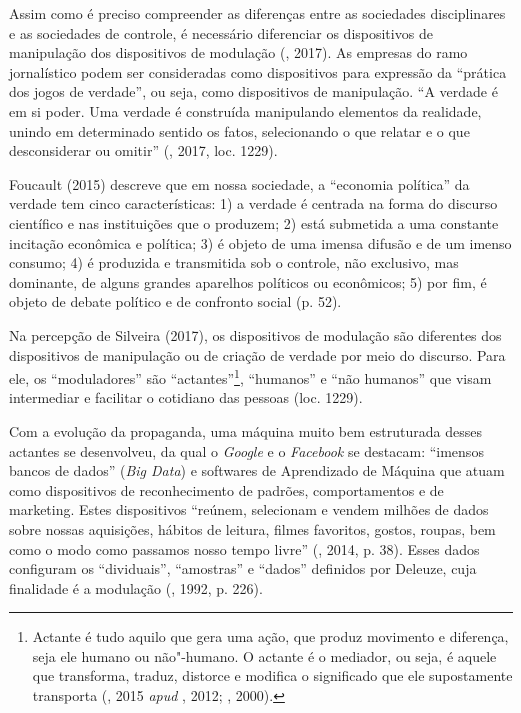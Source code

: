 Assim como é preciso compreender as diferenças entre as sociedades
disciplinares e as sociedades de controle, é necessário diferenciar os
dispositivos de manipulação dos dispositivos de modulação (,
2017). As empresas do ramo jornalístico podem ser consideradas como
dispositivos para expressão da ``prática dos jogos de verdade'', ou
seja, como dispositivos de manipulação. ``A verdade é em si poder. Uma
verdade é construída manipulando elementos da realidade, unindo em
determinado sentido os fatos, selecionando o que relatar e o que
desconsiderar ou omitir'' (, 2017, loc. 1229).

Foucault (2015) descreve que em nossa sociedade, a ``economia política''
da verdade tem cinco características: 1) a verdade é centrada na forma
do discurso científico e nas instituições que o produzem; 2) está
submetida a uma constante incitação econômica e política; 3) é objeto de
uma imensa difusão e de um imenso consumo; 4) é produzida e transmitida
sob o controle, não exclusivo, mas dominante, de alguns grandes
aparelhos políticos ou econômicos; 5) por fim, é objeto de debate
político e de confronto social (p. 52).

Na percepção de Silveira (2017), os dispositivos de modulação são
diferentes dos dispositivos de manipulação ou de criação de verdade por
meio do discurso. Para ele, os ``moduladores'' são
``actantes''\footnote{Actante é tudo aquilo que gera uma ação, que
  produz movimento e diferença, seja ele humano ou não"-humano. O actante
  é o mediador, ou seja, é aquele que transforma, traduz, distorce e
  modifica o significado que ele supostamente transporta (, 2015
  \emph{apud} , 2012; , 2000).}, ``humanos'' e ``não humanos'' que
visam intermediar e facilitar o cotidiano das pessoas (loc. 1229).

Com a evolução da propaganda, uma máquina muito bem estruturada desses
actantes se desenvolveu, da qual o \emph{Google} e o \emph{Facebook} se
destacam: ``imensos bancos de dados'' (\emph{Big Data}) e softwares de
Aprendizado de Máquina que atuam como dispositivos de reconhecimento de
padrões, comportamentos e de marketing. Estes dispositivos ``reúnem,
selecionam e vendem milhões de dados sobre nossas aquisições, hábitos de
leitura, filmes favoritos, gostos, roupas, bem como o modo como passamos
nosso tempo livre'' (, 2014, p. 38). Esses dados configuram os
``dividuais'', ``amostras'' e ``dados'' definidos por Deleuze, cuja
finalidade é a modulação (, 1992, p. 226).


